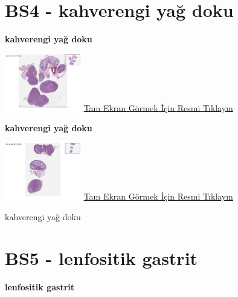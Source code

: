 \documentclass[
  letterpaper,
  DIV=11,
  numbers=noendperiod]{scrreprt}
\begin{document}
\hypertarget{sec-BS4}{%
\section{BS4 - kahverengi yağ doku}\label{sec-BS4}}

\textbf{kahverengi yağ doku}

\href{https://images.patolojiatlasi.com/BS4/HE1.html}{\includegraphics[width=0.25\textwidth,height=\textheight]{./screenshots/thumbnail_BS4-HE1.png}}
\href{https://images.patolojiatlasi.com/BS4/HE1.html}{Tam Ekran Görmek
İçin Resmi Tıklayın}

\textbf{kahverengi yağ doku}

\href{https://images.patolojiatlasi.com/BS4/HE2.html}{\includegraphics[width=0.25\textwidth,height=\textheight]{./screenshots/thumbnail_BS4-HE2.png}}
\href{https://images.patolojiatlasi.com/BS4/HE2.html}{Tam Ekran Görmek
İçin Resmi Tıklayın}

\begin{tcolorbox}[enhanced jigsaw, colbacktitle=quarto-callout-tip-color!10!white, colback=white, titlerule=0mm, opacityback=0, colframe=quarto-callout-tip-color-frame, opacitybacktitle=0.6, bottomrule=.15mm, breakable, coltitle=black, title=\textcolor{quarto-callout-tip-color}{\faLightbulb}\hspace{0.5em}{Tanı}, toprule=.15mm, toptitle=1mm, bottomtitle=1mm, arc=.35mm, rightrule=.15mm, leftrule=.75mm, left=2mm]

kahverengi yağ doku

\end{tcolorbox}

\hypertarget{sec-BS5}{%
\section{BS5 - lenfositik gastrit}\label{sec-BS5}}

\textbf{lenfositik gastrit}
\end{document}
